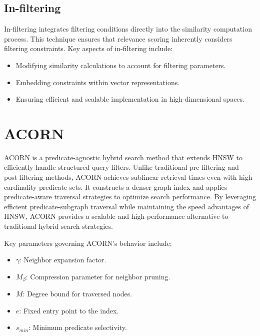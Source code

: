 \subsection{In-filtering}
In-filtering integrates filtering conditions directly into the similarity computation process. This technique ensures that relevance scoring inherently considers filtering constraints. Key aspects of in-filtering include:
\begin{itemize}
    \item Modifying similarity calculations to account for filtering parameters.
    \item Embedding constraints within vector representations.
    \item Ensuring efficient and scalable implementation in high-dimensional spaces.
\end{itemize}

\section{ACORN}
ACORN is a predicate-agnostic hybrid search method that extends HNSW to efficiently handle structured query filters. Unlike traditional pre-filtering and post-filtering methods, ACORN achieves sublinear retrieval times even with high-cardinality predicate sets. It constructs a denser graph index and applies predicate-aware traversal strategies to optimize search performance. By leveraging efficient predicate-subgraph traversal while maintaining the speed advantages of HNSW, ACORN provides a scalable and high-performance alternative to traditional hybrid search strategies.

Key parameters governing ACORN's behavior include:
\begin{itemize}
    \item $\gamma$: Neighbor expansion factor.
    \item $M_{\beta}$: Compression parameter for neighbor pruning.
    \item $M$: Degree bound for traversed nodes.
    \item $e$: Fixed entry point to the index.
    \item $s_{min}$: Minimum predicate selectivity.
\end{itemize}

